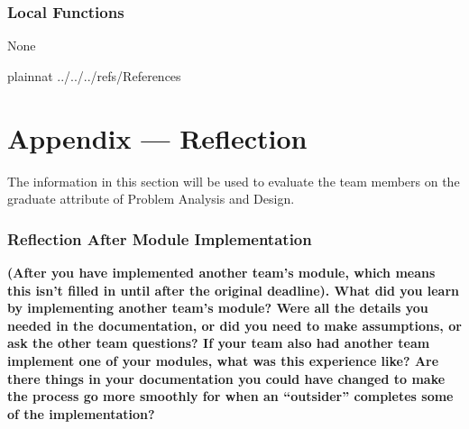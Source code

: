 \documentclass[12pt, titlepage]{article}
\begin{document}
\subsubsection{Local Functions}

None

\newpage

 {plainnat}
 {../../../refs/References}

\newpage{}

\section*{Appendix --- Reflection}

The information in this section will be used to evaluate the team members on the
graduate attribute of Problem Analysis and Design.


\subsubsection*{Reflection After Module Implementation}
\textbf{(After you have implemented another team's module, which means this
  isn't filled in until after the original deadline). What did you learn by
  implementing another team's module? Were all the details you needed in the
  documentation, or did you need to make assumptions, or ask the other team
  questions?  If your team also had another team implement one of your modules,
  what was this experience like?  Are there things in your documentation you
  could have changed to make the process go more smoothly for when an
  ``outsider'' completes some of the implementation?} \\
\end{document}
